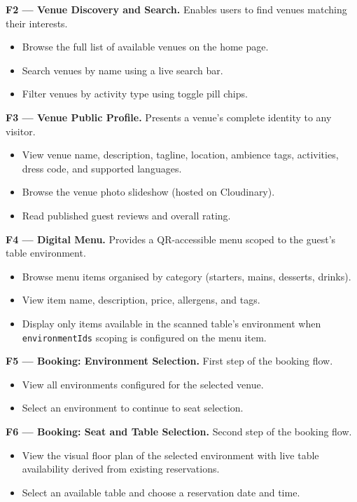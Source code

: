 \documentclass[12pt,a4paper,oneside]{report}
\begin{document}
\textbf{F2 --- Venue Discovery and Search.}
Enables users to find venues matching their interests.
\begin{itemize}[leftmargin=1.5em, topsep=2pt, itemsep=1pt]
  \item Browse the full list of available venues on the home page.
  \item Search venues by name using a live search bar.
  \item Filter venues by activity type using toggle pill chips.
\end{itemize}

\textbf{F3 --- Venue Public Profile.}
Presents a venue's complete identity to any visitor.
\begin{itemize}[leftmargin=1.5em, topsep=2pt, itemsep=1pt]
  \item View venue name, description, tagline, location, ambience tags,
        activities, dress code, and supported languages.
  \item Browse the venue photo slideshow (hosted on Cloudinary).
  \item Read published guest reviews and overall rating.
\end{itemize}

\textbf{F4 --- Digital Menu.}
Provides a QR-accessible menu scoped to the guest's table environment.
\begin{itemize}[leftmargin=1.5em, topsep=2pt, itemsep=1pt]
  \item Browse menu items organised by category (starters, mains, desserts,
        drinks).
  \item View item name, description, price, allergens, and tags.
  \item Display only items available in the scanned table's environment when
        \texttt{environmentIds} scoping is configured on the menu item.
\end{itemize}

\textbf{F5 --- Booking: Environment Selection.}
First step of the booking flow.
\begin{itemize}[leftmargin=1.5em, topsep=2pt, itemsep=1pt]
  \item View all environments configured for the selected venue.
  \item Select an environment to continue to seat selection.
\end{itemize}

\textbf{F6 --- Booking: Seat and Table Selection.}
Second step of the booking flow.
\begin{itemize}[leftmargin=1.5em, topsep=2pt, itemsep=1pt]
  \item View the visual floor plan of the selected environment with live
        table availability derived from existing reservations.
  \item Select an available table and choose a reservation date and time.
\end{itemize}
\end{document}
